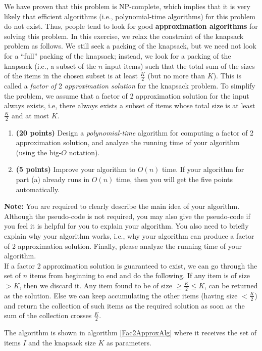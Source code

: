 \documentclass[paper=a4, fontsize=11pt]{scrartcl} %
\numberwithin{equation}{section} %
\numberwithin{figure}{section} %
\numberwithin{table}{section} %
\begin{document}
\begin{enumerate}
We have proven that this problem is NP-complete, which implies that it is very likely that efficient algorithms (i.e., polynomial-time algorithms) for this problem do not exist. Thus, people tend to look for good \textbf{approximation algorithms} for solving this problem. In this exercise, we relax the constraint of the knapsack problem as follows. We still seek a packing of the knapsack, but we need not look for a \enquote{full} packing of the knapsack; instead, we look for a packing of the knapsack (i.e., a subset of the $n$ input items) such that the total sum of the sizes of the items in the chosen subset is at least $\frac{K}{2}$ (but no more than $K$). This is called a \emph{factor of} 2 \emph{approximation solution} for the knapsack problem. To simplify the problem, we assume that a factor of 2 approximation solution for the input always exists, i.e, there always exists a subset of items whose total size is at least $\frac{K}{2}$ and at most $K$.
\begin{enumerate}
\item \textbf{(20 points)} Design a \emph{polynomial-time} algorithm for computing a factor of 2 approximation solution, and analyze the running time of your algorithm (using the big-$O$ notation).
\item \textbf{(5 points)} Improve your algorithm to $O(n)$ time. If your algorithm for part (a) already runs in $O(n)$ time, then you will get the five points automatically.
\end{enumerate}
\textbf{Note:} You are required to clearly describe the main idea of your algorithm. Although the pseudo-code is not required, you may also give the pseudo-code if you feel it is helpful for you to explain your algorithm. You also need to briefly explain why your algorithm works, i.e., why your algorithm can produce a factor of 2 approximation solution. Finally, please analyze the running time of your algorithm.\\

If a factor 2 approximation solution is guaranteed to exist, we can go through the set of $n$ items from beginning to end and do the following. If any item is of size $ > K$, then we discard it. Any item found to be of size $ \ge \frac{K}{2} \le K$, can be returned as the solution. Else we can keep accumulating the other items (having size $< \frac{K}{2}$) and return the collection of such items as the required solution as soon as the sum of the collection crosses $\frac{K}{2}$.

The algorithm is shown in algorithm \ref{Fac2ApproxAlg} where it receives the set of items $I$ and the knapsack size $K$ as parameters.


\end{enumerate}
\end{document}
